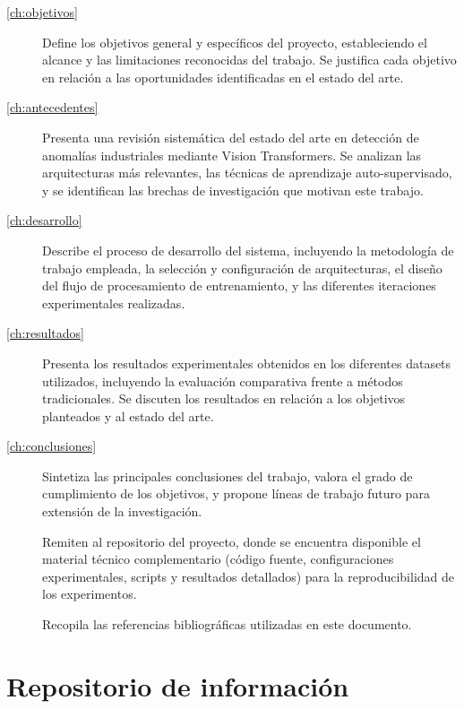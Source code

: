 \begin{description}
    \item[\autoref{ch:objetivos}] Define los objetivos general y específicos del proyecto, estableciendo el alcance y las limitaciones reconocidas del trabajo. Se justifica cada objetivo en relación a las oportunidades identificadas en el estado del arte.
    
    \item[\autoref{ch:antecedentes}] Presenta una revisión sistemática del estado del arte en detección de anomalías industriales mediante Vision Transformers. Se analizan las arquitecturas más relevantes, las técnicas de aprendizaje auto-supervisado, y se identifican las brechas de investigación que motivan este trabajo.
    
    \item[\autoref{ch:desarrollo}] Describe el proceso de desarrollo del sistema, incluyendo la metodología de trabajo empleada, la selección y configuración de arquitecturas, el diseño del flujo de procesamiento de entrenamiento, y las diferentes iteraciones experimentales realizadas.
    
    \item[\autoref{ch:resultados}] Presenta los resultados experimentales obtenidos en los diferentes datasets utilizados, incluyendo la evaluación comparativa frente a métodos tradicionales. Se discuten los resultados en relación a los objetivos planteados y al estado del arte.
    
    \item[\autoref{ch:conclusiones}] Sintetiza las principales conclusiones del trabajo, valora el grado de cumplimiento de los objetivos, y propone líneas de trabajo futuro para extensión de la investigación.
    
    \item[] Remiten al repositorio del proyecto, donde se encuentra disponible el material técnico complementario (código fuente, configuraciones experimentales, scripts y resultados detallados) para la reproducibilidad de los experimentos.
    
    \item[] Recopila las referencias bibliográficas utilizadas en este documento.
\end{description}


\section{Repositorio de información}
\label{sec:repositorio}

